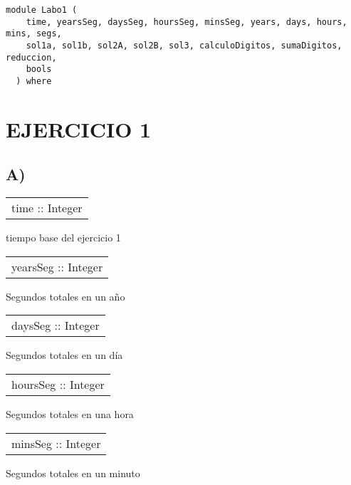 \label{module:Labo1}
\haddockbeginheader
{\haddockverb\begin{verbatim}
module Labo1 (
    time, yearsSeg, daysSeg, hoursSeg, minsSeg, years, days, hours, mins, segs,
    sol1a, sol1b, sol2A, sol2B, sol3, calculoDigitos, sumaDigitos, reduccion,
    bools
  ) where\end{verbatim}}
\haddockendheader

\section{EJERCICIO 1}
\subsection{A)}
\begin{haddockdesc}
\item[\begin{tabular}{@{}l}
time :: Integer
\end{tabular}]
{\haddockbegindoc
tiempo base del ejercicio 1\par}
\end{haddockdesc}
\begin{haddockdesc}
\item[\begin{tabular}{@{}l}
yearsSeg :: Integer
\end{tabular}]
{\haddockbegindoc
Segundos totales en un año\par}
\end{haddockdesc}
\begin{haddockdesc}
\item[\begin{tabular}{@{}l}
daysSeg :: Integer
\end{tabular}]
{\haddockbegindoc
Segundos totales en un día\par}
\end{haddockdesc}
\begin{haddockdesc}
\item[\begin{tabular}{@{}l}
hoursSeg :: Integer
\end{tabular}]
{\haddockbegindoc
Segundos totales en una hora\par}
\end{haddockdesc}
\begin{haddockdesc}
\item[\begin{tabular}{@{}l}
minsSeg :: Integer
\end{tabular}]
{\haddockbegindoc
Segundos totales en un minuto\par}
\end{haddockdesc}
